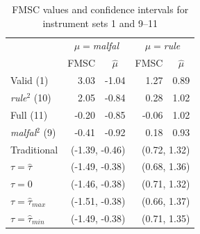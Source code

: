 \documentclass[12pt]{article}
\theoremstyle{definition}
\begin{document}
\begin{table}[htbp]
\caption{FMSC values and confidence intervals for instrument sets 1 and 9--11}
\label{tab:endog}
\small
\centering
 \begin{tabular}{lrrrr}\hline\hline
 & \multicolumn{2}{c}{$\mu=$\emph{malfal}}& \multicolumn{2}{c}{$\mu=$\emph{rule}}\\
&\multicolumn{1}{c}{FMSC}&\multicolumn{1}{c}{$\widehat{\mu}$}&\multicolumn{1}{c}{FMSC}&\multicolumn{1}{c}{$\widehat{\mu}$}\tabularnewline
\hline
Valid (1)& 3.03&-1.04& 1.27&0.89\tabularnewline
\emph{rule}$^2$ (10)& 2.05&-0.84& 0.28&1.02\tabularnewline
Full (11)&-0.20&-0.85& -0.06&1.02\tabularnewline
\emph{malfal}$^2$ (9)&-0.41&-0.92&0.18&0.93\tabularnewline
\hline
Traditional&\multicolumn{2}{r}{(-1.39, -0.46)}&\multicolumn{2}{r}{(0.72, 1.32)}\\
$\tau = \widehat{\tau}$&\multicolumn{2}{r}{(-1.49, -0.38)}&\multicolumn{2}{r}{(0.68, 1.36)}\\
$\tau = 0$&\multicolumn{2}{r}{(-1.46, -0.38)}&\multicolumn{2}{r}{(0.71, 1.32)}\\
$\tau = \widehat{\tau}_{max}$&\multicolumn{2}{r}{(-1.51, -0.38)}&\multicolumn{2}{r}{(0.66, 1.37)}\\
$\tau = \widehat{\tau}_{min}$&\multicolumn{2}{r}{(-1.49, -0.38)}&\multicolumn{2}{r}{(0.71, 1.35)}\\
\hline
\end{tabular}


\footnotesize
\end{table}
\end{document}
